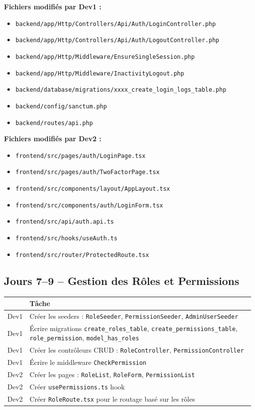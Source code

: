 \documentclass[12pt,a4paper]{report}
\begin{document}
\textbf{Fichiers modifiés par Dev1 :}
\begin{itemize}
    \item \texttt{backend/app/Http/Controllers/Api/Auth/LoginController.php}
    \item \texttt{backend/app/Http/Controllers/Api/Auth/LogoutController.php}
    \item \texttt{backend/app/Http/Middleware/EnsureSingleSession.php}
    \item \texttt{backend/app/Http/Middleware/InactivityLogout.php}
    \item \texttt{backend/database/migrations/xxxx\_create\_login\_logs\_table.php}
    \item \texttt{backend/config/sanctum.php}
    \item \texttt{backend/routes/api.php}
\end{itemize}

\textbf{Fichiers modifiés par Dev2 :}
\begin{itemize}
    \item \texttt{frontend/src/pages/auth/LoginPage.tsx}
    \item \texttt{frontend/src/pages/auth/TwoFactorPage.tsx}
    \item \texttt{frontend/src/components/layout/AppLayout.tsx}
    \item \texttt{frontend/src/components/auth/LoginForm.tsx}
    \item \texttt{frontend/src/api/auth.api.ts}
    \item \texttt{frontend/src/hooks/useAuth.ts}
    \item \texttt{frontend/src/router/ProtectedRoute.tsx}
\end{itemize}

\subsection*{Jours 7--9 -- Gestion des Rôles et Permissions}

\begin{tabularx}{\textwidth}{l X}
    \toprule
    & \textbf{Tâche} \\
    \midrule
    Dev1 & Créer les seeders : \texttt{RoleSeeder}, \texttt{PermissionSeeder}, \texttt{AdminUserSeeder} \\
    Dev1 & Écrire migrations \texttt{create\_roles\_table}, \texttt{create\_permissions\_table}, \texttt{role\_permission}, \texttt{model\_has\_roles} \\
    Dev1 & Créer les contrôleurs CRUD : \texttt{RoleController}, \texttt{PermissionController} \\
    Dev1 & Écrire le middleware \texttt{CheckPermission} \\
    Dev2 & Créer les pages : \texttt{RoleList}, \texttt{RoleForm}, \texttt{PermissionList} \\
    Dev2 & Créer \texttt{usePermissions.ts} hook \\
    Dev2 & Créer \texttt{RoleRoute.tsx} pour le routage basé sur les rôles \\
    \bottomrule
\end{tabularx}
\end{document}
